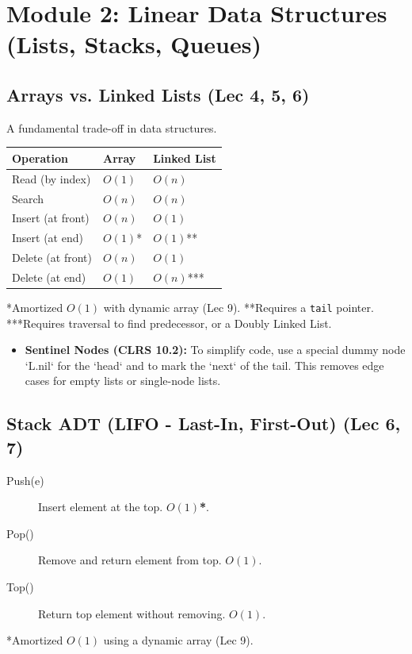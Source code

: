 
\section{Module 2: Linear Data Structures (Lists, Stacks, Queues)}

\subsection{Arrays vs. Linked Lists (Lec 4, 5, 6)}
A fundamental trade-off in data structures.
\begin{center}
\begin{tabular}{|l|l|l|}
\hline
\textbf{Operation} & \textbf{Array} & \textbf{Linked List} \\ \hline
Read (by index) & $O(1)$ & $O(n)$ \\
Search & $O(n)$ & $O(n)$ \\
Insert (at front) & $O(n)$ & $O(1)$ \\
Insert (at end) & $O(1)$* & $O(1)$** \\
Delete (at front) & $O(n)$ & $O(1)$ \\
Delete (at end) & $O(1)$ & $O(n)$*** \\
\hline
\end{tabular}
\end{center}
\begin{footnotesize}
*Amortized $O(1)$ with dynamic array (Lec 9).
**Requires a \texttt{tail} pointer.
***Requires traversal to find predecessor, or a Doubly Linked List.
\end{footnotesize}
\begin{itemize}
    \item \textbf{Sentinel Nodes (CLRS 10.2):} To simplify code, use a special dummy node `L.nil` for the `head` and to mark the `next` of the tail. This removes edge cases for empty lists or single-node lists.
\end{itemize}

\subsection{Stack ADT (LIFO - Last-In, First-Out) (Lec 6, 7)}
\begin{description}
    \item[Push(e)] Insert element at the top. \textbf{$O(1)$*}.
    \item[Pop()] Remove and return element from top. \textbf{$O(1)$}.
    \item[Top()] Return top element without removing. \textbf{$O(1)$}.
\end{description}
\begin{footnotesize}
*Amortized $O(1)$ using a dynamic array (Lec 9).
\end{footnotesize}

